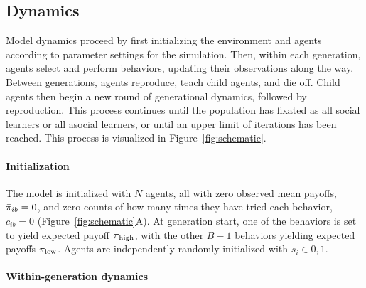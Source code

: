 \documentclass[letterpaper,11.5pt]{scrartcl}
\begin{document}
\subsection{Dynamics}

Model dynamics proceed by first initializing the environment and agents according
to parameter settings for the simulation. Then, within each generation,
agents select and perform behaviors, updating their observations along the way.
Between generations, agents reproduce, teach child agents, and die off. 
Child agents then begin a new round of generational dynamics, followed by
reproduction. This process continues until the population has fixated as
all social learners or all asocial learners, or until an upper limit of 
iterations has been reached. This process is visualized in
Figure~\ref{fig:schematic}.


\paragraph{Initialization}

The model is initialized with $N$ agents, all with zero observed mean payoffs, 
$\bar\pi_{ib} = 0$, and zero counts of how many times
they have tried each behavior, $c_{ib} = 0$ (Figure~\ref{fig:schematic}A).
At generation start, one of the behaviors is set to 
yield expected payoff $\pi_{\mathrm{high}}$, with the other $B-1$ behaviors yielding
expected payoffs $\pi_{\mathrm{low}}$. Agents are independently randomly initialized with $s_i
\in 0,1$.


\paragraph{Within-generation dynamics}
\end{document}
